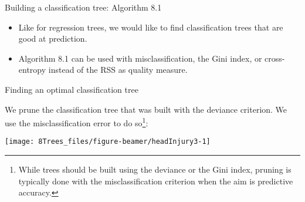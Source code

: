 \documentclass[
  10pt,
  ignorenonframetext,
]{beamer}
\newenvironment{Shaded}{\begin{snugshade}}{\end{snugshade}}
\newcommand{\AttributeTok}[1]{\textcolor[rgb]{0.77,0.63,0.00}{#1}}
\newcommand{\DecValTok}[1]{\textcolor[rgb]{0.00,0.00,0.81}{#1}}
\newcommand{\FunctionTok}[1]{\textcolor[rgb]{0.00,0.00,0.00}{#1}}
\newcommand{\NormalTok}[1]{#1}
\newcommand{\OtherTok}[1]{\textcolor[rgb]{0.56,0.35,0.01}{#1}}
\newcommand{\SpecialCharTok}[1]{\textcolor[rgb]{0.00,0.00,0.00}{#1}}
\newcommand{\StringTok}[1]{\textcolor[rgb]{0.31,0.60,0.02}{#1}}
\providecommand{\tightlist}{%
  \setlength{\itemsep}{0pt}\setlength{\parskip}{0pt}}
\begin{document}
\begin{frame}
\begin{block}{Building a classification tree: Algorithm 8.1}
\protect\hypertarget{building-a-classification-tree-algorithm-8.1}{}
\(~\)

\begin{itemize}
\tightlist
\item
  Like for regression trees, we would like to find classification trees
  that are good at prediction.
\end{itemize}

\vspace{2mm}

\begin{itemize}
\tightlist
\item
  Algorithm 8.1 can be used with misclassification, the Gini index, or
  cross-entropy instead of the RSS as quality measure.
\end{itemize}
\end{block}
\end{frame}

\begin{frame}[fragile]
\begin{block}{Finding an optimal classification tree}
\protect\hypertarget{finding-an-optimal-classification-tree}{}
\vspace{2mm}

We prune the classification tree that was built with the deviance
criterion. We use the misclassification error to do
so\footnote{While trees should be built using the deviance or the Gini index, pruning is typically done with the misclassification criterion when the aim is predictive accuracy.}:

\vspace{3mm}

\scriptsize

\begin{Shaded}
\end{Shaded}

\begin{center}\texttt{[image: 8Trees\_files/figure-beamer/headInjury3-1]} \end{center}
\end{block}
\end{frame}
\end{document}
